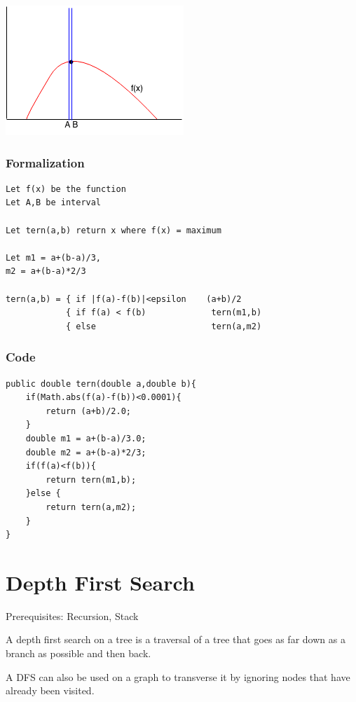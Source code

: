 \documentclass[11pt,oneside]{book}
\makeatletter
\def\maxwidth#1{\ifdim\Gin@nat@width>#1 #1\else\Gin@nat@width\fi}
\makeatother
\begin{document}
\includegraphics[width=\maxwidth{\textwidth}]{ternarysearch7.png}

\subsubsection{Formalization}

\begin{lstlisting}
Let f(x) be the function 
Let A,B be interval

Let tern(a,b) return x where f(x) = maximum

Let m1 = a+(b-a)/3,
m2 = a+(b-a)*2/3

tern(a,b) = { if |f(a)-f(b)|<epsilon    (a+b)/2 
            { if f(a) < f(b)             tern(m1,b)
            { else                       tern(a,m2)
\end{lstlisting}

\subsubsection{Code}

\begin{lstlisting}
public double tern(double a,double b){
    if(Math.abs(f(a)-f(b))<0.0001){
        return (a+b)/2.0;
    }
    double m1 = a+(b-a)/3.0;
    double m2 = a+(b-a)*2/3;
    if(f(a)<f(b)){
        return tern(m1,b);
    }else {
        return tern(a,m2);
    }
}
\end{lstlisting}

        \section{ Depth First Search }
        

Prerequisites: Recursion, Stack

A depth first search on a tree is a traversal of a tree that goes as far down as a branch as possible and then back.

A DFS can also be used on a graph to transverse it by ignoring nodes that have already been visited.
\end{document}
